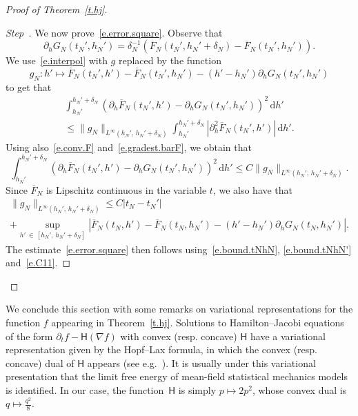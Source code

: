 \documentclass[10pt]{amsart}
\theoremstyle{definition}\newtheorem{defi}[theo]{Definition}\newtheorem{rema}[theo]{Remark}\newtheorem{exam}[theo]{Example}\newtheorem{exem}[theo]{Example}\newtheorem{nota}[theo]{Notation}
\renewcommand{\d}{\mathrm{d}}
\newcommand{\sfH}{\mathsf{H}}
\newcommand{\1}{\mathds{1}}
\renewcommand{\le}{\leqslant}
\renewcommand{\bar}{\overline}
\newcommand{\de}{\delta}
\newcounter{stepcount}
\newenvironment{step}{\refstepcounter{stepcount}\begin{proof}[Step~\thestepcount]}{\let\qed\relax\end{proof}}
\begin{document}
\begin{proof}[Proof of Theorem~\ref{t.hj}]
\begin{step}\label{prooftheo2.1step6}
We now prove~\eqref{e.error.square}. Observe that
\[
\partial_h G_N\left(t_N',h_N'\right) = \de_N^{-1} \left(\bar F_N\left(t_N',h_N'+ \de_N\right) - \bar F_N\left(t_N',h_N'\right)\right).
\]
We use~\eqref{e.interpol} with $g$ replaced by the function
\[
g_N : h' \mapsto \bar F_N\left(t_N',h'\right) - \bar F_N\left(t_N',h_N'\right) - \left(h'-h_N'\right)\partial_h G_N\left(t_N',h_N'\right)
\]
to get that
\begin{multline*}
\int_{h_N'}^{h_N'+ \de_N} \left(\partial_h \bar F_N\left(t_N',h'\right) - \partial_h G_N\left(t_N',h_N'\right)\right)^2 \, \d h'
\\
\le \|g_N\|_{L^\infty\left(h_N',\,h_N' + \de_N\right)} 
\int_{h_N'}^{h_N' + \de_N} \left|\partial_h^2 \bar F_N\left(t_N',h'\right)\right| \, \d h'.
\end{multline*}
Using also~\eqref{e.conv.F} and~\eqref{e.gradest.barF}, we obtain that
\[
\int_{h_N'}^{h_N'+ \de_N} \left(\partial_h \bar F_N(t_N',h') - \partial_h G_N(t_N',h_N')\right)^2 \, \d h' \le C \|g_N\|_{L^\infty(h_N',\,h_N' + \de_N)}.
\]
Since $\bar F_N$ is Lipschitz continuous in the variable $t$, we also have that
\begin{multline*}
\|g_N\|_{L^\infty\left(h_N',\,h_N' + \de_N\right)} \le C \left|t_N - t_N'\right|
\\
+ \sup_{h'\,\in\,\left[h_N',\,h_N' + \de_N\right]} \left| \bar F_N\left(t_N,h'\right) - \bar F_N\left(t_N,h_N'\right) - \left(h'-h_N'\right)\partial_h G_N\left(t_N,h_N'\right) \right|.
\end{multline*}
The estimate~\eqref{e.error.square} then follows using~\eqref{e.bound.tNhN}, \eqref{e.bound.tNhN'} and~\eqref{e.C11}.\qedhere
\end{step}\let\qed\relax
\end{proof}

We conclude this section with some remarks on variational representations for the function $f$ appearing in Theorem~\ref{t.hj}. Solutions to Hamilton--Jacobi equations of the form $\partial_t f - \sfH(\nabla f)$ with convex (resp. concave) $\sfH$ have a variational representation given by the Hopf--Lax formula, in which the convex (resp. concave) dual of $\sfH$ appears (see e.g.~\cite[Theorem~10.3.4.3]{evans}). It is usually under this variational presentation that the limit free energy of mean-field statistical mechanics models is identified. In our case, the function~$\sfH$ is simply $p \mapsto 2p^2$, whose convex dual is $q \mapsto \tfrac {q^2}{8}$.
\end{document}
